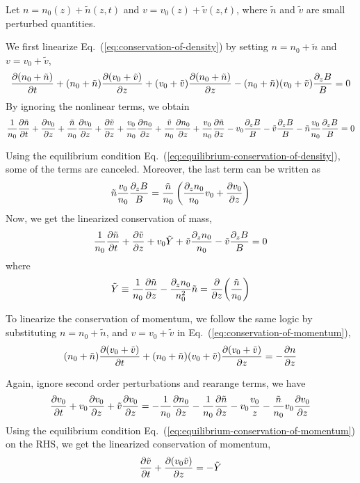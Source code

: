 Let $n = n_0(z) + \tilde{n}(z,t)$ and $v = v_0(z) + \tilde{v}(z,t)$, where $\tilde{n}$ and $\tilde{v}$ are small perturbed quantities.

We first linearize Eq.~(\ref{eq:conservation-of-density}) by setting $n=n_0+\tilde{n}$ and $v=v_0+\tilde{v}$,
\[    \pdv{(n_0+\tilde{n})}{t}
	+ (n_0+\tilde{n})\pdv{(v_0+\tilde{v})}{z}
	+ (v_0+\tilde{v})\pdv{(n_0+\tilde{n})}{z}
	- (n_0+\tilde{n})(v_0+\tilde{v})\frac{\partial_z B}{B} = 0
\]
By ignoring the nonlinear terms, we obtain
\[ \frac{1}{n_0}\pdv{\tilde{n}}{t}
	+ \pdv{v_0}{z} + \frac{\tilde{n}}{n_0}\pdv{v_0}{z} + \pdv{\tilde{v}}{z}
	+ \frac{v_0}{n_0}\pdv{n_0}{z} + \frac{\tilde{v}}{n_0}\pdv{n_0}{z} + \frac{v_0}{n_0}\pdv{\tilde{n}}{z}
	- v_0\frac{\partial_z B}{B} - \tilde{v}\frac{\partial_z B}{B} - \tilde{n}\frac{v_0}{n_0}\frac{\partial_z B}{B} = 0
\]


Using the equilibrium condition Eq.~(\ref{eq:equilibrium-conservation-of-density}), some of the terms are canceled. Moreover, the last term can be written as
\[ \tilde{n}\frac{v_0}{n_0}\frac{\partial_z B}{B} = \frac{\tilde{n}}{n_0}\left( \frac{\partial_z n_0}{n_0}v_0 + \pdv{v_0}{z} \right) \]
Now, we get the linearized conservation of mass,
\begin{equation} \label{eq:linearized-conservation-of-density}
	\frac{1}{n_0}\pdv{\tilde{n}}{t}
	+ \pdv{\tilde{v}}{z} + v_0\tilde{Y} + \tilde{v}\frac{\partial_z n_0}{n_0} - \tilde{v}\frac{\partial_z B}{B} = 0
\end{equation}
where
\[ \tilde{Y} \equiv \frac{1}{n_0}\pdv{\tilde{n}}{z} - \frac{\partial_z n_0}{n_0^2}\tilde{n} = \pdv{z}(\frac{\tilde{n}}{n_0}) \]

To linearize the conservation of momentum, we follow the same logic by substituting $n=n_0+\tilde{n}$, and $v=v_0+\tilde{v}$ in Eq.~(\ref{eq:conservation-of-momentum}),
\[ (n_0+\tilde{n})\pdv{(v_0+\tilde{v})}{t} + (n_0+\tilde{n})(v_0+\tilde{v})\pdv{(v_0+\tilde{v})}{z} = -\pdv{n}{z} \]

Again, ignore second order perturbations and rearange terms, we have
\[ \pdv{v_0}{t} + v_0\pdv{v_0}{z} + \tilde{v}\pdv{v_0}{z}
	= -\frac{1}{n_0}\pdv{n_0}{z} -\frac{1}{n_0}\pdv{\tilde{n}}{z} -v_0\frac{v_0}{z} - \frac{\tilde{n}}{n_0}v_0\pdv{v_0}{z} \]
Using the equilibrium condition Eq.~(\ref{eq:equilibrium-conservation-of-momentum}) on the RHS, we get the linearized conservation of momentum,
\begin{equation} \label{eq:linearized-conservation-of-momentum}
	\pdv{\tilde{v}}{t} + \pdv{(v_0\tilde{v})}{z} = -\tilde{Y}
\end{equation}

